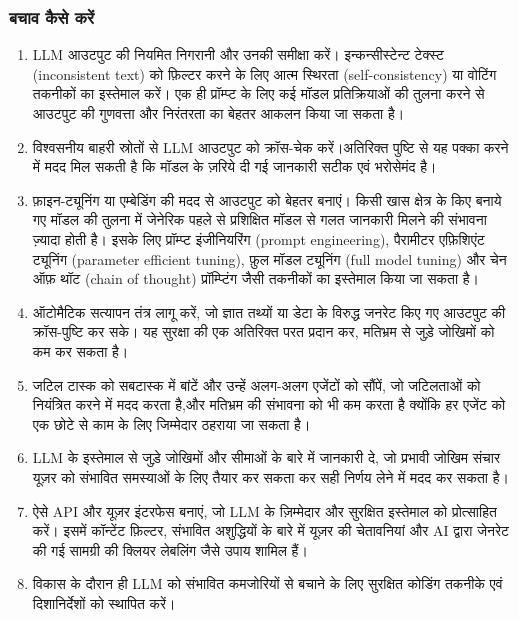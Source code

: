 \documentclass[
]{article}
\providecommand{\tightlist}{%
  \setlength{\itemsep}{0pt}\setlength{\parskip}{0pt}}
\begin{document}
\subsubsection{बचाव कैसे करें}\label{ux92cux91aux935-ux915ux938-ux915ux930}

\begin{enumerate}
\def\labelenumi{\arabic{enumi}.}
\tightlist
\item
  LLM आउटपुट की नियमित निगरानी और उनकी समीक्षा करें। इन्कन्सीस्टेन्ट टेक्स्ट
  (inconsistent text) को फ़िल्टर करने के लिए आत्म स्थिरता (self-consistency)
  या वोटिंग तकनीकों का इस्तेमाल करें। एक ही प्रॉम्प्ट के लिए कई मॉडल प्रतिक्रियाओं की
  तुलना करने से आउटपुट की गुणवत्ता और निरंतरता का बेहतर आकलन किया जा सकता है।
\item
  विश्वसनीय बाहरी स्रोतों से LLM आउटपुट को क्रॉस-चेक करें।अतिरिक्त पुष्टि से यह पक्का
  करने में मदद मिल सकती है कि मॉडल के ज़रिये दी गई जानकारी सटीक एवं भरोसेमंद है।
\item
  फ़ाइन-ट्यूनिंग या एम्बेडिंग की मदद से आउटपुट को बेहतर बनाएं। किसी खास क्षेत्र के किए
  बनाये गए मॉडल की तुलना में जेनेरिक पहले से प्रशिक्षित मॉडल से गलत जानकारी मिलने की
  संभावना ज़्यादा होती है। इसके लिए प्रॉम्प्ट इंजीनियरिंग (prompt engineering),
  पैरामीटर एफ़िशिएंट ट्यूनिंग (parameter efficient tuning), फ़ुल मॉडल ट्यूनिंग
  (full model tuning) और चेन ऑफ़ थॉट (chain of thought) प्रॉम्प्टिंग जैसी
  तकनीकों का इस्तेमाल किया जा सकता है।
\item
  ऑटोमैटिक सत्यापन तंत्र लागू करें, जो ज्ञात तथ्यों या डेटा के विरुद्ध जनरेट किए गए
  आउटपुट की क्रॉस-पुष्टि कर सके। यह सुरक्षा की एक अतिरिक्त परत प्रदान कर, मतिभ्रम
  से जुड़े जोखिमों को कम कर सकता है।
\item
  जटिल टास्क को सबटास्क में बांटें और उन्हें अलग-अलग एजेंटों को सौंपें, जो जटिलताओं को
  नियंत्रित करने में मदद करता है,और मतिभ्रम की संभावना को भी कम करता है क्योंकि हर
  एजेंट को एक छोटे से काम के लिए जिम्मेदार ठहराया जा सकता है।
\item
  LLM के इस्तेमाल से जुड़े जोखिमों और सीमाओं के बारे में जानकारी दे, जो प्रभावी जोखिम
  संचार यूज़र को संभावित समस्याओं के लिए तैयार कर सकता कर सही निर्णय लेने में मदद कर
  सकता है।
\item
  ऐसे API और यूज़र इंटरफेस बनाएं, जो LLM के ज़िम्मेदार और सुरक्षित इस्तेमाल को
  प्रोत्साहित करें। इसमें कॉन्टेंट फ़िल्टर, संभावित अशुद्धियों के बारे में यूज़र की चेतावनियां
  और AI द्वारा जेनरेट की गई सामग्री की क्लियर लेबलिंग जैसे उपाय शामिल हैं।
\item
  विकास के दौरान ही LLM को संभावित कमजोरियों से बचाने के लिए सुरक्षित कोडिंग
  तकनीके एवं दिशानिर्देशों को स्थापित करें।
\end{enumerate}
\end{document}
